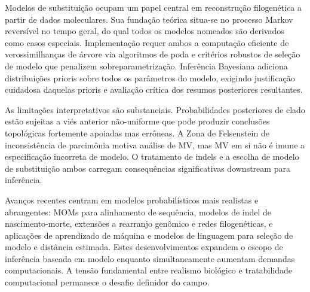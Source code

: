 Modelos de substituição ocupam um papel central em reconstrução filogenética a partir de dados moleculares. Sua fundação teórica situa-se no processo Markov reversível no tempo geral, do qual todos os modelos nomeados são derivados como casos especiais. Implementação requer ambos a computação eficiente de verossimilhanças de árvore via algoritmos de poda e critérios robustos de seleção de modelo que penalizem sobreparametrização. Inferência Bayesiana adiciona distribuições prioris sobre todos os parâmetros do modelo, exigindo justificação cuidadosa daquelas prioris e avaliação crítica dos resumos posteriores resultantes.

As limitações interpretativos são substanciais. Probabilidades posteriores de clado estão sujeitas a viés anterior não-uniforme que pode produzir conclusões topológicas fortemente apoiadas mas errôneas. A Zona de Felsenstein de inconsistência de parcimônia motiva análise de MV, mas MV em si não é imune a especificação incorreta de modelo. O tratamento de indels e a escolha de modelo de substituição ambos carregam consequências significativas downstream para inferência.

Avanços recentes centram em modelos probabilísticos mais realistas e abrangentes: MOMs para alinhamento de sequência, modelos de indel de nascimento-morte, extensões a rearranjo genômico e redes filogenéticas, e aplicações de aprendizado de máquina e modelos de linguagem para seleção de modelo e distância estimada. Estes desenvolvimentos expandem o escopo de inferência baseada em modelo enquanto simultaneamente aumentam demandas computacionais. A tensão fundamental entre realismo biológico e tratabilidade computacional permanece o desafio definidor do campo.

